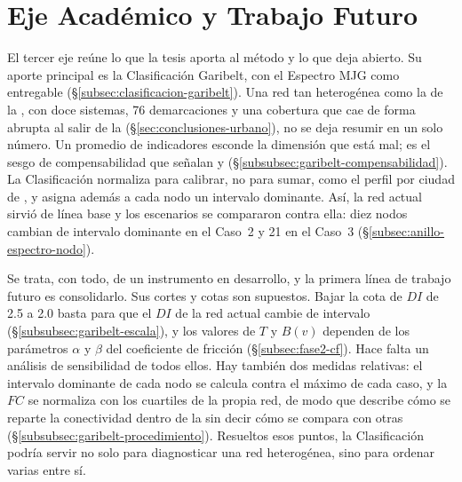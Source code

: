 \section{Eje Académico y Trabajo Futuro}
\label{sec:conclusiones-academico}

El tercer eje reúne lo que la tesis aporta al método y lo que deja abierto. Su
aporte principal es la Clasificación Garibelt, con el Espectro MJG como
entregable (§\ref{subsec:clasificacion-garibelt}). Una red tan heterogénea como
la de la \zmvm{}, con doce sistemas, 76 demarcaciones y una cobertura que cae
de forma abrupta al salir de la \cdmx{} (§\ref{sec:conclusiones-urbano}), no se
deja resumir en un solo número. Un promedio de indicadores esconde la dimensión que está mal; es
el sesgo de compensabilidad que señalan \citet{hossain2024} y \citet{deng2023}
(§\ref{subsubsec:garibelt-compensabilidad}). La Clasificación normaliza para
calibrar, no para sumar, como el perfil por ciudad de \citet{kujala2018}, y
asigna además a cada nodo un intervalo dominante. Así, la red actual sirvió de
línea base y los escenarios se compararon contra ella: diez nodos cambian de
intervalo dominante en el Caso~2 y 21 en el Caso~3 (§\ref{subsec:anillo-espectro-nodo}).

Se trata, con todo, de un instrumento en desarrollo, y la primera línea de
trabajo futuro es consolidarlo. Sus cortes y cotas son supuestos. Bajar la cota
de $DI$ de 2.5 a 2.0 basta para que el $DI$ de la red actual cambie de intervalo
(§\ref{subsubsec:garibelt-escala}), y los valores de $T$ y $B(v)$ dependen de
los parámetros $\alpha$ y $\beta$ del coeficiente de fricción
(§\ref{subsec:fase2-cf}). Hace falta un análisis de sensibilidad de todos
ellos. Hay también dos medidas relativas: el intervalo dominante de cada nodo se
calcula contra el máximo de cada caso, y la $FC$ se normaliza con los cuartiles
de la propia red, de modo que describe cómo se reparte la conectividad dentro
de la \zmvm{} sin decir cómo se compara con otras
(§\ref{subsubsec:garibelt-procedimiento}). Resueltos esos puntos, la
Clasificación podría servir no solo para diagnosticar una red heterogénea, sino
para ordenar varias entre sí.

